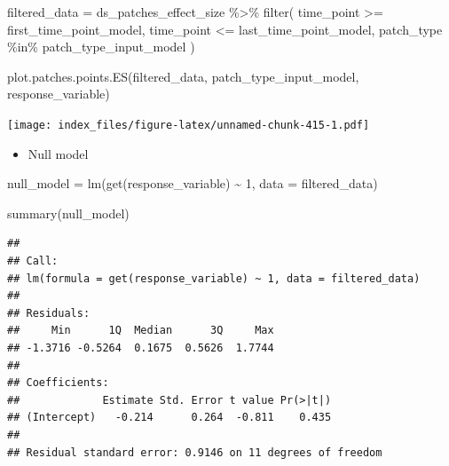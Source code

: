 \documentclass[
]{article}
\newenvironment{Shaded}{\begin{snugshade}}{\end{snugshade}}
\newcommand{\AttributeTok}[1]{\textcolor[rgb]{0.77,0.63,0.00}{#1}}
\newcommand{\DecValTok}[1]{\textcolor[rgb]{0.00,0.00,0.81}{#1}}
\newcommand{\FunctionTok}[1]{\textcolor[rgb]{0.00,0.00,0.00}{#1}}
\newcommand{\NormalTok}[1]{#1}
\newcommand{\OtherTok}[1]{\textcolor[rgb]{0.56,0.35,0.01}{#1}}
\newcommand{\SpecialCharTok}[1]{\textcolor[rgb]{0.00,0.00,0.00}{#1}}
\providecommand{\tightlist}{%
  \setlength{\itemsep}{0pt}\setlength{\parskip}{0pt}}
\begin{document}
\begin{Shaded}
\begin{Highlighting}[]
\NormalTok{filtered\_data }\OtherTok{=}\NormalTok{ ds\_patches\_effect\_size }\SpecialCharTok{\%\textgreater{}\%}
  \FunctionTok{filter}\NormalTok{(}
\NormalTok{    time\_point }\SpecialCharTok{\textgreater{}=}\NormalTok{ first\_time\_point\_model,}
\NormalTok{    time\_point }\SpecialCharTok{\textless{}=}\NormalTok{ last\_time\_point\_model,}
\NormalTok{    patch\_type }\SpecialCharTok{\%in\%}\NormalTok{ patch\_type\_input\_model}
\NormalTok{  )}
\end{Highlighting}
\end{Shaded}

\begin{Shaded}
\begin{Highlighting}[]
\FunctionTok{plot.patches.points.ES}\NormalTok{(filtered\_data,}
\NormalTok{                       patch\_type\_input\_model,}
\NormalTok{                       response\_variable)}
\end{Highlighting}
\end{Shaded}

\texttt{[image: index\_files/figure-latex/unnamed-chunk-415-1.pdf]}

\begin{itemize}
\tightlist
\item
  Null model
\end{itemize}

\begin{Shaded}
\begin{Highlighting}[]
\NormalTok{null\_model }\OtherTok{=} \FunctionTok{lm}\NormalTok{(}\FunctionTok{get}\NormalTok{(response\_variable) }\SpecialCharTok{\textasciitilde{}}
                  \DecValTok{1}\NormalTok{,}
                \AttributeTok{data =}\NormalTok{ filtered\_data)}

\FunctionTok{summary}\NormalTok{(null\_model)}
\end{Highlighting}
\end{Shaded}

\begin{verbatim}
## 
## Call:
## lm(formula = get(response_variable) ~ 1, data = filtered_data)
## 
## Residuals:
##     Min      1Q  Median      3Q     Max 
## -1.3716 -0.5264  0.1675  0.5626  1.7744 
## 
## Coefficients:
##             Estimate Std. Error t value Pr(>|t|)
## (Intercept)   -0.214      0.264  -0.811    0.435
## 
## Residual standard error: 0.9146 on 11 degrees of freedom
\end{verbatim}
\end{document}
